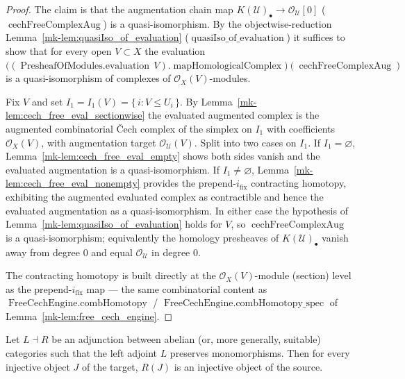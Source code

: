 \begin{proof}
  The claim is that the augmentation chain map
  \(K(\mathcal{U})_\bullet \to \mathcal{O}_{\mathcal{U}}[0]\)
  (\(\operatorname{cechFreeComplexAug}\)) is a quasi-isomorphism. By the
  objectwise-reduction Lemma~\ref{mk-lem:quasiIso_of_evaluation}
  (\(\operatorname{quasiIso\_of\_evaluation}\)) it suffices to show that for every open
  \(V \subset X\) the evaluation
  \(\bigl((\operatorname{PresheafOfModules.evaluation}\, V).
  \operatorname{mapHomologicalComplex}\bigr)(\operatorname{cechFreeComplexAug})\) is a
  quasi-isomorphism of complexes of \(\mathcal{O}_X(V)\)-modules.

  Fix \(V\) and set \(I_1 = I_1(V) = \{\,i : V \leq U_i\,\}\). By
  Lemma~\ref{mk-lem:cech_free_eval_sectionwise} the evaluated augmented complex is the
  augmented combinatorial {\v C}ech complex of the simplex on \(I_1\) with
  coefficients \(\mathcal{O}_X(V)\), with augmentation target
  \(\mathcal{O}_{\mathcal{U}}(V)\). Split into two cases on \(I_1\). If
  \(I_1 = \varnothing\), Lemma~\ref{mk-lem:cech_free_eval_empty} shows both sides vanish
  and the evaluated augmentation is a quasi-isomorphism. If \(I_1 \neq \varnothing\),
  Lemma~\ref{mk-lem:cech_free_eval_nonempty} provides the prepend-\(i_{\mathrm{fix}}\)
  contracting homotopy, exhibiting the augmented evaluated complex as contractible and
  hence the evaluated augmentation as a quasi-isomorphism. In either case the
  hypothesis of Lemma~\ref{mk-lem:quasiIso_of_evaluation} holds for \(V\), so
  \(\operatorname{cechFreeComplexAug}\) is a quasi-isomorphism; equivalently the
  homology presheaves of \(K(\mathcal{U})_\bullet\) vanish away from degree \(0\) and
  equal \(\mathcal{O}_{\mathcal{U}}\) in degree \(0\).

  The contracting homotopy is built directly at the \(\mathcal{O}_X(V)\)-module
  (section) level as the prepend-\(i_{\mathrm{fix}}\) map — the same combinatorial
  content as \(\operatorname{FreeCechEngine.combHomotopy}\) /
  \(\operatorname{FreeCechEngine.combHomotopy\_spec}\) of
  Lemma~\ref{mk-lem:free_cech_engine}.
\end{proof}

\begin{lemma}
  \label{mk-lem:injective_of_adjoint}
  \mathlibok

  Let \(L \dashv R\) be an adjunction between abelian (or, more generally, suitable)
  categories such that the left adjoint \(L\) preserves monomorphisms. Then for every
  injective object \(J\) of the target, \(R(J)\) is an injective object of the source.
\end{lemma}

